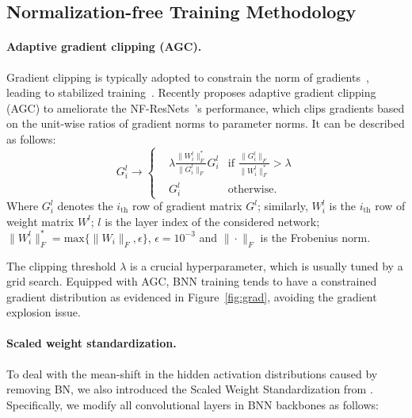 \documentclass[final]{cvpr}
\begin{document}
\subsection{Normalization-free Training Methodology} \label{sec:method_nf}
\paragraph{Adaptive gradient clipping (AGC).} Gradient clipping is typically adopted to constrain the norm of gradients~\cite{pascanu2013difficulty}, leading to stabilized training~\cite{merity2017regularizing}. Recently \cite{brock2021agc} proposes adaptive gradient clipping (AGC) to ameliorate the NF-ResNets~\cite{brock2021characterizing}'s performance, which clips gradients based on the unit-wise ratios of gradient norms to parameter norms. It can be described as follows:
\begin{equation}
G_i^l\rightarrow\left\{
\begin{aligned}
& \lambda\frac{\|W_i^l\|^*_F}{\|G_i^l\|_F}G^l_i & \text{if } \frac{\|G_i^l\|_F}{\|W_i^l\|^*_F} > \lambda \\
& G_i^l & \text{otherwise.}
\end{aligned}
\right.
\end{equation}
Where $G_i^l$ denotes the $i_{\mathrm{th}}$ row of gradient matrix $G^l$; similarly, $W_i^l$ is the $i_{\mathrm{th}}$ row of weight matrix $W^l$; $l$ is the layer index of the considered network; $\|W_i^l\|^*_F=\mathrm{max}\{\|W_i\|_F,\epsilon\}$, $\epsilon=10^{-3}$ and $\|\cdot\|_F$ is the Frobenius norm.

The clipping threshold $\lambda$ is a crucial hyperparameter, which is usually tuned by a grid search. Equipped with AGC, BNN training tends to have a constrained gradient distribution as evidenced in Figure~\ref{fig:grad}, avoiding the gradient explosion issue.

\paragraph{Scaled weight standardization.} To deal with the mean-shift in the hidden activation distributions caused by removing BN, we also introduced the Scaled Weight Standardization from \cite{brock2021characterizing}. Specifically, we modify all convolutional layers in BNN backbones as follows:
\end{document}
